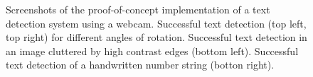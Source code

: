 \documentclass[12pt]{article}
\begin{document}
\begin{figure}[ht]
    \centering
    \caption
    {
      Screenshots of the proof-of-concept implementation of a text detection system using
      a webcam. Successful text detection (top left, top right) for different angles of rotation.
      Successful text detection in an image cluttered by high contrast edges (bottom left).
      Successful text detection of a handwritten number string (botton right).
    }
    \label{fig:webcam}
\end{figure}
\end{document}
